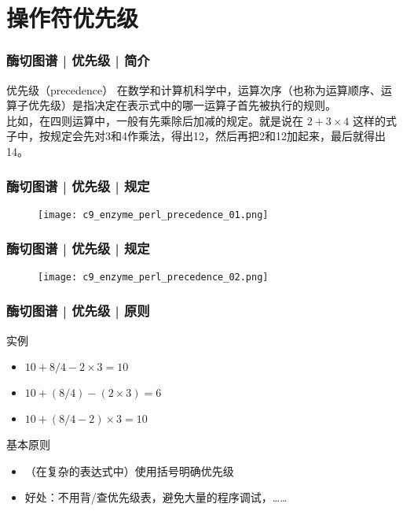 \section{操作符优先级}
\begin{frame}
  \frametitle{酶切图谱 | 优先级 | 简介}
  \begin{block}{优先级（precedence）}
    在数学和计算机科学中，运算次序（也称为运算顺序、运算子优先级）是指决定在表示式中的哪一运算子首先被执行的规则。\\
    \vspace{1em}
    比如，在四则运算中，一般有先乘除后加减的规定。就是说在 $2 + 3 \times 4 $ 这样的式子中，按规定会先对3和4作乘法，得出12，然后再把2和12加起来，最后就得出14。
  \end{block}
\end{frame}

\begin{frame}
  \frametitle{酶切图谱 | 优先级 | 规定}
  \begin{figure}
    \centering
    \texttt{[image: c9\_enzyme\_perl\_precedence\_01.png]}
  \end{figure}
\end{frame}

\begin{frame}
  \frametitle{酶切图谱 | 优先级 | 规定}
  \begin{figure}
    \centering
    \texttt{[image: c9\_enzyme\_perl\_precedence\_02.png]}
  \end{figure}
\end{frame}

\begin{frame}
  \frametitle{酶切图谱 | 优先级 | 原则}
  \begin{block}{实例}
    \begin{itemize}
      \item $10 + 8 / 4 - 2 \times 3 = 10$
      \item $10 + (8 / 4) - (2 \times 3) = 6$
      \item $10 + (8 / 4 - 2) \times 3 = 10$
    \end{itemize}
  \end{block}
  \pause
  \begin{block}{\alert{基本原则}}
    \begin{itemize}
      \item （在复杂的表达式中）使用括号明确优先级
      \item 好处：不用背/查优先级表，避免大量的程序调试，……
    \end{itemize}
  \end{block}
\end{frame}

